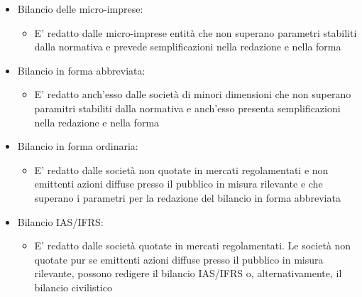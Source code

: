 \documentclass{report}
\begin{document}
\begin{itemize}
  \item{Bilancio delle micro-imprese: \\
    \begin{itemize}
      \item{E' redatto dalle micro-imprese entità che non superano parametri stabiliti dalla normativa e prevede semplificazioni nella redazione e nella forma}
    \end{itemize}
  }
  \item{Bilancio in forma abbreviata: \\
    \begin{itemize}
      \item{E' redatto anch'esso dalle società di minori dimensioni che non superano paramitri stabiliti dalla normativa e anch'esso presenta semplificazioni nella redazione e nella forma}
    \end{itemize}
  }  
  \item{Bilancio in forma ordinaria: \\
    \begin{itemize}
      \item{E' redatto dalle società non quotate in mercati regolamentati e non emittenti azioni diffuse presso il pubblico in misura rilevante e che superano i parametri per la redazione del bilancio in forma abbreviata}
    \end{itemize}
  }
  \item{Bilancio IAS/IFRS: \\
    \begin{itemize}
      \item{E' redatto dalle società quotate in mercati regolamentati. Le società non quotate pur se emittenti azioni diffuse presso il pubblico in misura rilevante, possono redigere il bilancio IAS/IFRS o, alternativamente, il bilancio civilistico}
    \end{itemize}
  }
\end{itemize}
\end{document}
